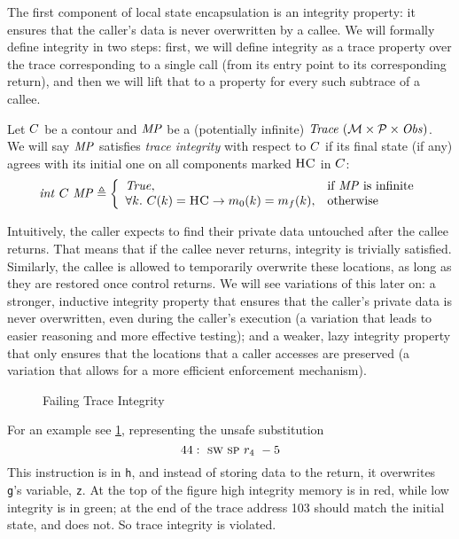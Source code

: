 \documentclass[acmsmall,review,anonymous]{acmart}\settopmatter{printfolios=true,printccs=false,printacmref=false}
\begin{document}
The first component of local state encapsulation is an integrity
property: it ensures that the caller's data is never overwritten by a
callee. We will formally define integrity in two steps: first, we will
define integrity as a trace property over the trace corresponding to a
single call (from its entry point to its corresponding return), and
then we will lift that to a property for every such subtrace of a
callee.

\label{def:trace-integrity}
Let $C$ be a contour and $\mathit{MP}$ be a (potentially infinite)
$\mathit{Trace}~({\mathcal M} \times \mathcal{P} \times \mathit{Obs})$. We will say $\mathit{MP}$ satisfies {\em trace integrity} with
respect to $C$ if its final state (if any) agrees with its
initial one on all components marked $\textsc{HC}$ in $C$:
%
\[
\mathit{int} ~ C ~ \mathit{MP} \triangleq
\left \{ \begin{array}{ll}
  \mathit{True}, & \text{if $\mathit{MP}$ is infinite}\\
  \forall k. ~ C(k) = \textsc{HC} \rightarrow m_0(k) = m_f(k), & \text{otherwise} \\
\end{array}
\right .
\]

Intuitively, the caller expects to find their private data untouched
after the callee returns. That means that if the callee never returns,
integrity is trivially satisfied. Similarly, the callee is allowed to
temporarily overwrite these locations, as long as they are restored
once control returns. We will see variations of this later on: a
stronger, inductive integrity property that ensures that the caller's
private data is never overwritten, even during the caller's execution
(a variation that leads to easier reasoning and more effective testing);
and a weaker, lazy integrity property that only ensures that the
locations that a caller accesses are preserved (a variation that allows
for a more efficient enforcement mechanism).

\begin{figure}
  \integrityexample
  \caption{Failing Trace Integrity}
  \label{fig:intex}
\end{figure}

For an example see \cref{fig:intex}, representing the unsafe substitution
\[
  44: ~ \textsc{sw} ~ \textsc{sp} ~ r_4 ~ -5
\]
This instruction is in {\tt h}, and instead of storing data to the return,
it overwrites {\tt g}'s variable, {\tt z}. At the top of the figure high
integrity memory is in red, while low integrity is in green; at the end of the
trace address 103 should match the initial state, and does not. So trace
integrity is violated.
\end{document}
